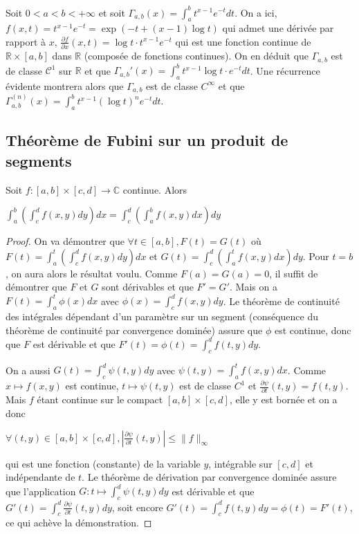 \begin{example}
Soit $0 < a < b < +\infty$ et soit $\Gamma_{a,b}(x) = \int_a^b t^{x-1} e^{-t} dt$. On a ici, $f(x,t) = t^{x-1} e^{-t} = \exp(-t + (x-1)\log t)$ qui admet une dérivée par rapport à $x$, $\frac{\partial f}{\partial x}(x,t) = \log t \cdot t^{x-1} e^{-t}$ qui est une fonction continue de $\mathbb{R} \times [a,b]$ dans $\mathbb{R}$ (composée de fonctions continues). On en déduit que $\Gamma_{a,b}$ est de classe $\mathcal{C}^1$ sur $\mathbb{R}$ et que $\Gamma_{a,b}'(x) = \int_a^b t^{x-1} \log t \cdot e^{-t} dt$. Une récurrence évidente montrera alors que $\Gamma_{a,b}$ est de classe $C^\infty$ et que $\Gamma_{a,b}^{(n)}(x) = \int_a^b t^{x-1} (\log t)^n e^{-t} dt$.
\end{example}

\subsection{Théorème de Fubini sur un produit de segments}

\begin{thm}
  Soit $f : [a,b] \times [c,d] \to \mathbb{C}$ continue. Alors
  
  $\int_a^b \left(\int_c^d f(x,y) dy\right) dx = \int_c^d \left(\int_a^b f(x,y) dx\right) dy$
  \end{thm}
  
  \begin{proof}
  On va démontrer que $\forall t \in [a,b], F(t) = G(t)$ où $F(t) = \int_a^t \left(\int_c^d f(x,y) dy\right) dx$ et $G(t) = \int_c^d \left(\int_a^t f(x,y) dx\right) dy$. Pour $t = b$, on aura alors le résultat voulu. Comme $F(a) = G(a) = 0$, il suffit de démontrer que $F$ et $G$ sont dérivables et que $F' = G'$. Mais on a $F(t) = \int_a^t \phi(x) dx$ avec $\phi(x) = \int_c^d f(x,y) dy$. Le théorème de continuité des intégrales dépendant d'un paramètre sur un segment (conséquence du théorème de continuité par convergence dominée) assure que $\phi$ est continue, donc que $F$ est dérivable et que $F'(t) = \phi(t) = \int_c^d f(t,y) dy$.
  
  On a aussi $G(t) = \int_c^d \psi(t,y) dy$ avec $\psi(t,y) = \int_a^t f(x,y) dx$. Comme $x \mapsto f(x,y)$ est continue, $t \mapsto \psi(t,y)$ est de classe $C^1$ et $\frac{\partial \psi}{\partial t}(t,y) = f(t,y)$. Mais $f$ étant continue sur le compact $[a,b] \times [c,d]$, elle y est bornée et on a donc
  
  $\forall (t,y) \in [a,b] \times [c,d], |\frac{\partial \psi}{\partial t}(t,y)| \leq \|f\|_\infty$
  
  qui est une fonction (constante) de la variable $y$, intégrable sur $[c,d]$ et indépendante de $t$. Le théorème de dérivation par convergence dominée assure que l'application $G : t \mapsto \int_c^d \psi(t,y) dy$ est dérivable et que $G'(t) = \int_c^d \frac{\partial \psi}{\partial t}(t,y) dy$, soit encore $G'(t) = \int_c^d f(t,y) dy = \phi(t) = F'(t)$, ce qui achève la démonstration.
  \end{proof}
  

